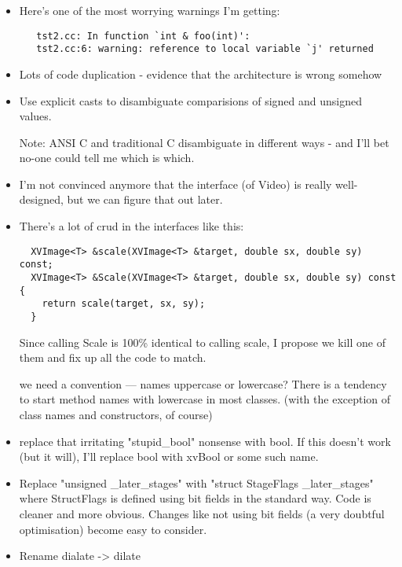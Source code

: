 \begin{itemize}
\item
 Here's one of the most worrying warnings I'm getting:

\begin{verbatim}
   tst2.cc: In function `int & foo(int)':
   tst2.cc:6: warning: reference to local variable `j' returned
\end{verbatim}

\item
Lots of code duplication - evidence that the architecture is wrong somehow

\item
Use explicit casts to disambiguate comparisions of signed and
unsigned values.

Note: ANSI C and traditional C disambiguate in different ways - and
 I'll bet no-one could tell me which is which.

\item
I'm not convinced anymore that the interface (of Video) is really
well-designed, but we can figure that out later.

\item
There's a lot of crud in the interfaces  like this:
\begin{verbatim}
  XVImage<T> &scale(XVImage<T> &target, double sx, double sy) const;
  XVImage<T> &Scale(XVImage<T> &target, double sx, double sy) const {
    return scale(target, sx, sy);
  }
\end{verbatim}

Since calling Scale is 100\% identical to calling scale, I propose we
kill one of them and fix up all the code to match.

we need a convention --- names uppercase or lowercase?
There is a tendency to start method names with lowercase 
in most classes. (with the exception of class names and constructors,
of course)

\item
replace that irritating "stupid\_bool" nonsense with bool.
If this doesn't work (but it will), I'll replace bool with xvBool
or some such name. 

\item
Replace "unsigned \_later\_stages" with "struct StageFlags \_later\_stages"
where StructFlags is defined using bit fields in the standard way.
Code is cleaner and more obvious.
Changes like not using bit fields (a very doubtful optimisation) become
easy to consider.

\item
Rename dialate -> dilate


\end{itemize}
